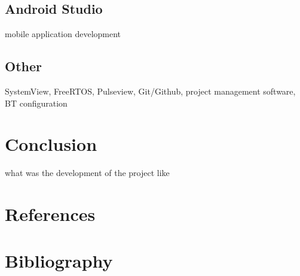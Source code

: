 \documentclass[12pt,a4paper]{article}
\begin{document}
		\subsection{Android Studio}
		mobile application development
		\newpage
		
		\subsection{Other}
		SystemView, FreeRTOS, Pulseview, Git/Github, project management software, BT configuration
		\newpage
	
	\section{Conclusion}
	what was the development of the project like
	\newpage
	
	\section{References}
	\newpage
	
	\section{Bibliography}
	\newpage
	
\end{document}
